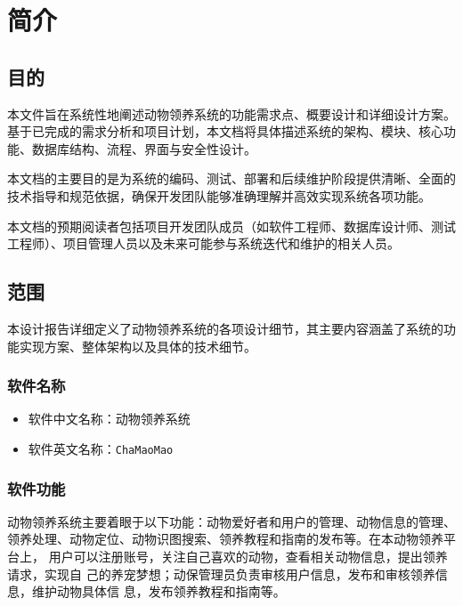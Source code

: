 \documentclass[12pt,a4paper,UTF8]{article}
\begin{document}

\maketoc    %

\section{简介}

\subsection{目的}

本文件旨在系统性地阐述动物领养系统的功能需求点、概要设计和详细设计方案。基于已完成的需求分析和项目计划，本文档将具体描述系统的架构、模块、核心功能、数据库结构、流程、界面与安全性设计。

本文档的主要目的是为系统的编码、测试、部署和后续维护阶段提供清晰、全面的技术指导和规范依据，确保开发团队能够准确理解并高效实现系统各项功能。

本文档的预期阅读者包括项目开发团队成员（如软件工程师、数据库设计师、测试工程师）、项目管理人员以及未来可能参与系统迭代和维护的相关人员。


\subsection{范围}

本设计报告详细定义了动物领养系统的各项设计细节，其主要内容涵盖了系统的功能实现方案、整体架构以及具体的技术细节。

\subsubsection{软件名称}

\begin{itemize}
  \item 软件中文名称：动物领养系统
  \item 软件英文名称：\verb|ChaMaoMao|
\end{itemize}

\subsubsection{软件功能}

动物领养系统主要着眼于以下功能：动物爱好者和用户的管理、动物信息的管理、
领养处理、动物定位、动物识图搜索、领养教程和指南的发布等。在本动物领养平台上，
用户可以注册账号，关注自己喜欢的动物，查看相关动物信息，提出领养请求，实现自
己的养宠梦想；动保管理员负责审核用户信息，发布和审核领养信息，维护动物具体信
息，发布领养教程和指南等。
\end{document}
